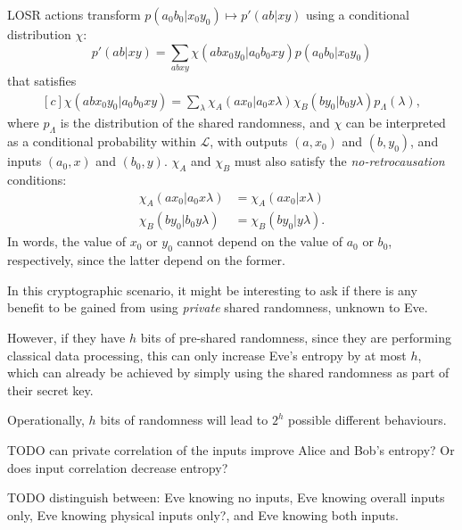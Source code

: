 \documentclass[10pt, a4paper]{article}
\numberwithin{equation}{section} %
\theoremstyle{definition}
\theoremstyle{plain}
\newcommand{\?}{\mathrel{?}} %
\newcommand{\Ls}{\mathcal{L}}
\begin{document}
      LOSR actions transform \(p(a_0 b_0|x_0 y_0) \mapsto p'(ab|xy)\) using a conditional distribution \(\chi\):
      \begin{equation}
        p'(ab|xy) = \sum_{abxy} \chi(abx_0y_0|a_0b_0xy) p(a_0b_0|x_0y_0)
      \end{equation}
      that satisfies
      \begin{equation}
        \begin{aligned}[c]
        \chi(abx_0y_0|a_0b_0xy) = \sum_{\lambda} \chi_A(ax_0|a_0x\lambda) \chi_B(by_0|b_0y\lambda) p_{\Lambda}(\lambda),
        \end{aligned}
      \end{equation}
      where \(p_{\Lambda}\) is the distribution of the shared randomness, and \(\chi\) can be interpreted as a conditional probability within \(\Ls\), with outputs \((a, x_0)\) and \((b, y_0)\), and inputs \((a_0, x)\) and \((b_0, y)\). \(\chi_A\) and \(\chi_B\) must also satisfy the \emph{no-retrocausation} conditions:
      \begin{align}
        \chi_A(ax_0|a_0x\lambda) &= \chi_A(ax_0|x\lambda) \\
        \chi_B(by_0|b_0y\lambda) &= \chi_B(by_0|y\lambda).
      \end{align}
      In words, the value of \(x_0\) or \(y_0\) cannot depend on the value of \(a_0\) or \(b_0\), respectively, since the latter depend on the former.

      In this cryptographic scenario, it might be interesting to ask if there is any benefit to be gained from using \emph{private} shared randomness, unknown to Eve. 


      However, if they have \(h\) bits of pre-shared randomness, since they are performing classical data processing, this can only increase Eve's entropy by at most \(h\), which can already be achieved by simply using the shared randomness as part of their secret key.

      Operationally, \(h\) bits of randomness will lead to \(2^h\) possible different behaviours.

      TODO can private correlation of the inputs improve Alice and Bob's entropy? Or does input correlation decrease entropy?

      TODO distinguish between: Eve knowing no inputs, Eve knowing overall inputs only, Eve knowing physical inputs only?, and Eve knowing both inputs.
\end{document}
